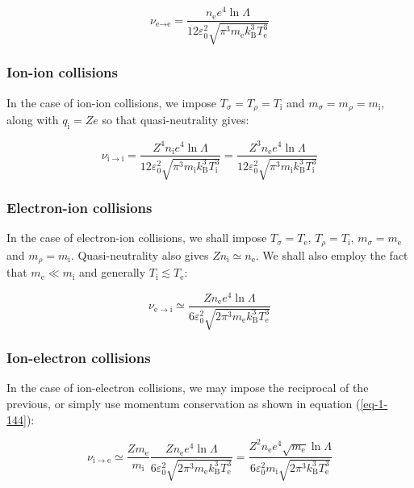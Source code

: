 \begin{equation}
    \nu_{\text{e}\to\text{e}}=\frac{n_\text{e}e^4\ln{\Lambda}}{12\varepsilon_0^2\sqrt{\pi^3m_\text{e}k_\mathrm{B}^3T_\text{e}^3}}
\end{equation}

\subsubsection{Ion-ion collisions}

In the case of ion-ion collisions, we impose $T_\sigma=T_\rho=T_\mathrm{i}$ and $m_\sigma=m_\rho=m_\mathrm{i}$, along with $q_\mathrm{i}=Ze$ so that quasi-neutrality gives:

\begin{equation}
    \nu_{\mathrm{i}\to\mathrm{i}}=\frac{Z^4n_\mathrm{i}e^4\ln{\Lambda}}{12\varepsilon_0^2\sqrt{\pi^3 m_\mathrm{i}k_\mathrm{B}^3T_\mathrm{i}^3}}=\frac{Z^3n_\text{e}e^4\ln{\Lambda}}{12\varepsilon_0^2\sqrt{\pi^3m_\mathrm{i}k_\mathrm{B}^3T_\mathrm{i}^3}}
\end{equation}

\subsubsection{Electron-ion collisions}

In the case of electron-ion collisions, we shall impose $T_\sigma=T_\text{e}$, $T_\rho=T_\mathrm{i}$, $m_\sigma=m_\text{e}$ and $m_\rho=m_\mathrm{i}$. Quasi-neutrality also gives $Zn_\mathrm{i}\simeq n_\text{e}$. We shall also employ the fact that $m_\text{e}\ll m_\mathrm{i}$ and generally $T_\mathrm{i}\lesssim T_\text{e}$:

\begin{equation}
    \nu_{\text{e}\to\mathrm{i}}\simeq\frac{Zn_\text{e}e^4\ln{\Lambda}}{6\varepsilon_0^2\sqrt{2\pi^3m_\text{e}k_\mathrm{B}^3T_\text{e}^3}}
\end{equation}

\subsubsection{Ion-electron collisions}

In the case of ion-electron collisions, we may impose the reciprocal of the previous, or simply use momentum conservation as shown in equation (\ref{eq-1-144}):

\begin{equation}
    \nu_{\mathrm{i}\to\text{e}}\simeq\frac{Zm_\text{e}}{m_\mathrm{i}}\frac{Zn_\text{e}e^4\ln{\Lambda}}{6\varepsilon_0^2\sqrt{2\pi^3m_\text{e}k_\mathrm{B}^3T_\text{e}^3}}=\frac{Z^2n_\text{e}e^4\sqrt{m_\text{e}}\ln{\Lambda}}{6\varepsilon_0^2m_\mathrm{i}\sqrt{2\pi^3k_\mathrm{B}^3T_\text{e}^3}}
\end{equation}


